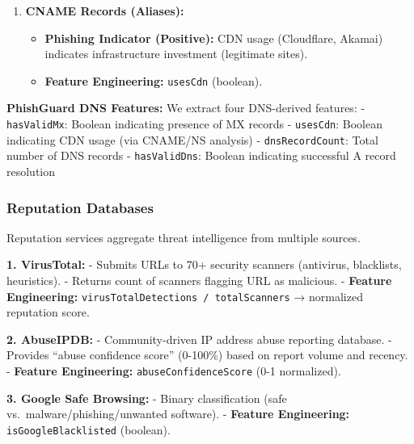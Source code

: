 \begin{enumerate}
  \begin{itemize}
    \item
    \textbf{Phishing Indicator:} Lack of email authentication records
    suggests domain isn't used for legitimate email.
  \item
    \textbf{Feature Engineering:} \texttt{hasSpf}, \texttt{hasDmarc}.
  \end{itemize}
\item
  \textbf{CNAME Records (Aliases):}

  \begin{itemize}
    \item
    \textbf{Phishing Indicator (Positive):} CDN usage (Cloudflare,
    Akamai) indicates infrastructure investment (legitimate sites).
  \item
    \textbf{Feature Engineering:} \texttt{usesCdn} (boolean).
  \end{itemize}
\end{enumerate}

\textbf{PhishGuard DNS Features:} We extract four DNS-derived features:
- \texttt{hasValidMx}: Boolean indicating presence of MX records -
\texttt{usesCdn}: Boolean indicating CDN usage (via CNAME/NS analysis) -
\texttt{dnsRecordCount}: Total number of DNS records -
\texttt{hasValidDns}: Boolean indicating successful A record resolution

\subsubsection{Reputation Databases}\label{reputation-databases}

Reputation services aggregate threat intelligence from multiple sources.

\textbf{1. VirusTotal:} - Submits URLs to 70+ security scanners
(antivirus, blacklists, heuristics). - Returns count of scanners
flagging URL as malicious. - \textbf{Feature Engineering:}
\texttt{virusTotalDetections\ /\ totalScanners} → normalized reputation
score.

\textbf{2. AbuseIPDB:} - Community-driven IP address abuse reporting
database. - Provides ``abuse confidence score'' (0-100\%) based on
report volume and recency. - \textbf{Feature Engineering:}
\texttt{abuseConfidenceScore} (0-1 normalized).

\textbf{3. Google Safe Browsing:} - Binary classification (safe
vs.~malware/phishing/unwanted software). - \textbf{Feature Engineering:}
\texttt{isGoogleBlacklisted} (boolean).

